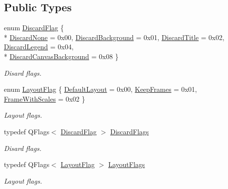 \subsection*{Public Types}
\begin{DoxyCompactItemize}
\item 
enum \hyperlink{class_qwt_plot_renderer_a34d2aa9911e93cb7871e6ce4210e41cd}{Discard\-Flag} \{ \\*
\hyperlink{class_qwt_plot_renderer_a34d2aa9911e93cb7871e6ce4210e41cdaf2b5ab01146a2e3f85454741465f1f16}{Discard\-None} = 0x00, 
\hyperlink{class_qwt_plot_renderer_a34d2aa9911e93cb7871e6ce4210e41cda8520c4587d5b11708b5b314936a07288}{Discard\-Background} = 0x01, 
\hyperlink{class_qwt_plot_renderer_a34d2aa9911e93cb7871e6ce4210e41cda2866f5a7d38cbfb34431b95c8dc952e1}{Discard\-Title} = 0x02, 
\hyperlink{class_qwt_plot_renderer_a34d2aa9911e93cb7871e6ce4210e41cdac20500aed74824fbea6c3b0d057a482a}{Discard\-Legend} = 0x04, 
\\*
\hyperlink{class_qwt_plot_renderer_a34d2aa9911e93cb7871e6ce4210e41cdab9bb1a51c26e57f6c2b7e650c6edab03}{Discard\-Canvas\-Background} = 0x08
 \}
\begin{DoxyCompactList}\small\item\em Disard flags. \end{DoxyCompactList}\item 
enum \hyperlink{class_qwt_plot_renderer_a111b4db55d3f620a33e75f6b398e4b4a}{Layout\-Flag} \{ \hyperlink{class_qwt_plot_renderer_a111b4db55d3f620a33e75f6b398e4b4aa7aeaacf4750595de6774ad45ba170c5d}{Default\-Layout} = 0x00, 
\hyperlink{class_qwt_plot_renderer_a111b4db55d3f620a33e75f6b398e4b4aa2de73b3e8c58b6603f3ef36a854436bf}{Keep\-Frames} = 0x01, 
\hyperlink{class_qwt_plot_renderer_a111b4db55d3f620a33e75f6b398e4b4aac81f7d56880ac4c03aaeab489c863a63}{Frame\-With\-Scales} = 0x02
 \}
\begin{DoxyCompactList}\small\item\em Layout flags. \end{DoxyCompactList}\item 
typedef Q\-Flags$<$ \hyperlink{class_qwt_plot_renderer_a34d2aa9911e93cb7871e6ce4210e41cd}{Discard\-Flag} $>$ \hyperlink{class_qwt_plot_renderer_aa61638c08ef926c0148dd12c9f830b2d}{Discard\-Flags}
\begin{DoxyCompactList}\small\item\em Disard flags. \end{DoxyCompactList}\item 
typedef Q\-Flags$<$ \hyperlink{class_qwt_plot_renderer_a111b4db55d3f620a33e75f6b398e4b4a}{Layout\-Flag} $>$ \hyperlink{class_qwt_plot_renderer_a20cf36bbea6b03a023d34c25b8b4b295}{Layout\-Flags}
\begin{DoxyCompactList}\small\item\em Layout flags. \end{DoxyCompactList}\end{DoxyCompactItemize}
